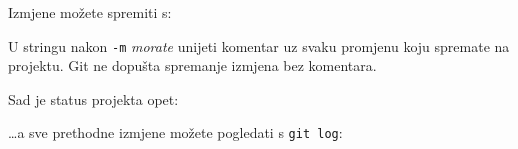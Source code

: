Izmjene možete spremiti s:


U stringu nakon \verb+-m+ \emph{morate} unijeti komentar uz svaku promjenu koju spremate na projektu.
Git ne dopušta spremanje izmjena bez komentara.

Sad je status projekta opet:



\dots{}a sve prethodne izmjene možete pogledati s \verb+git log+:





